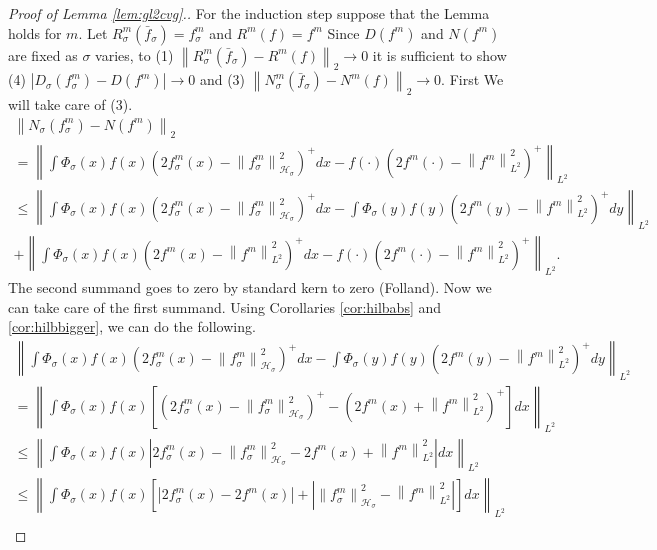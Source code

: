 \documentclass{article} %
\def\hsig{{\mathcal{H}_\sigma}}
\def\gkde{{\bar{f}_\sigma}} %
\def\fm{{\Phi_\sigma}} %
\def\girwlm{{R_{\sigma}^m}}
\def\grkdem{{f_{\sigma}^m}}
\def\rfm{{f^m}}
\def\fsigm{f_\sigma^m}
\def\l{\left}
\def\r{\right}
\theoremstyle{definition}
\begin{document}
\begin{proof}[Proof of Lemma \ref{lem:gl2cvg}.]
	For the induction step suppose that the Lemma holds for $m$. Let $\girwlm\left( \gkde \right) = \grkdem$ and $R^m\left( f \right) = \rfm$
	Since $D\left( f^m \right)$ and $N\left( f^m \right)$ are fixed as $\sigma$ varies, to (1) $\l\|R_{\sigma}^m \left( \gkde \right) - R^m\left( f \right)\r\|_2 \to 0$ it is sufficient to show (4) $\l|D_\sigma\left( \fsigm \right) - D \left( f^m \right) \r| \to 0$ and (3) $\l\| N_\sigma^m\left( \gkde \right) - N^m \left( f \right)\r\|_2 \to 0$.
	First We will take care of (3).
	\begin{eqnarray*}
		\l\|N_\sigma\left( \fsigm \right) - N \left( f^m \right) \r\|_2\\
		= \l\|\int \fm\left( x \right)f(x) \left( 2\grkdem\left( x \right) - \l\| \grkdem\r\|_{\hsig}^2 \right)^+ dx - f(\cdot) \left( 2\rfm\left( \cdot \right) - \l\|\rfm \r\|_{L^2}^2 \right)^+\r\|_{L^2}\\
		\le 
		\l\|\int \fm\left( x \right)f(x) \left( 2\grkdem\left( x \right) - \l\| \grkdem\r\|_{\hsig}^2 \right)^+ dx -\int \fm\left( y \right)f(y) \left( 2\rfm\left( y \right) - \l\| \rfm \r\|_{L^2}^2 \right)^+ dy \r\|_{L^2}\\
		+ \l\|\int \fm\left( x \right)f(x) \left( 2\rfm\left( x \right) - \l\| \rfm \r\|_{L^2}^2 \right)^+ dx - {f(\cdot) \left( 2\rfm\left( \cdot \right) - \l\|\rfm \r\|_{L^2}^2 \right)^+}\r\|_{L^2}.
	\end{eqnarray*}
	The second summand goes to zero by standard kern to zero (Folland). Now we can take care of the first summand. Using Corollaries \ref{cor:hilbabs} and \ref{cor:hilbbigger}, we can do the following.
	\begin{eqnarray*}
		\l\|\int \fm\left( x \right)f(x) \left( 2\grkdem\left( x \right) - \l\| \grkdem\r\|_{\hsig}^2 \right)^+ dx -\int \fm\left( y \right)f(y) \left( 2\rfm\left( y \right) - \l\| \rfm \r\|_{L^2}^2 \right)^+ dy \r\|_{L^2}\\
		= \l\|\int \fm\left( x \right)f(x) \l[\left( 2\grkdem\left( x \right) - \l\| \grkdem\r\|_{\hsig}^2 \right)^+ -  \left( 2\rfm\left( x \right) + \l\| \rfm \r\|_{L^2}^2 \right)^+ \r]dx \r\|_{L^2}\\
		\le \l\|\int \fm\left( x \right)f(x) \l| 2\grkdem\left( x \right) - \l\| \grkdem\r\|_{\hsig}^2  -   2\rfm\left( x \right) + \l\| \rfm \r\|_{L^2}^2  \r|dx \r\|_{L^2}\\
		\le \l\|\int \fm\left( x \right)f(x) \l[ \l| 2\grkdem\left( x \right) - 2\rfm\left( x \right)   \r| + \l| \l\| \grkdem \r\|_{\hsig}^2 - \l\| \rfm \r\|_{L^2}^2\r|\r]dx \r\|_{L^2}\\

\end{eqnarray*}
\end{proof}
\end{document}
